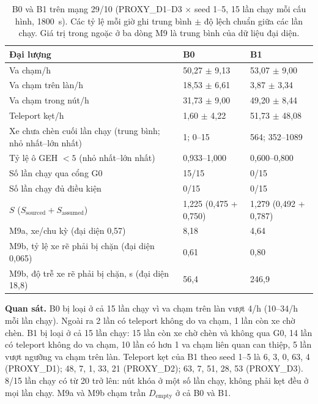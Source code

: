 \documentclass[../main.tex]{subfiles}
\begin{document}
\begin{table}[H]
\centering
\small
\caption{B0 và B1 trên mạng 29/10 (PROXY\_D1--D3 $\times$ seed 1--5, 15 lần chạy mỗi cấu hình, 1800~s). Các tỷ lệ mỗi giờ ghi trung bình $\pm$ độ lệch chuẩn giữa các lần chạy. Giá trị trong ngoặc ở ba dòng M9 là trung bình của dữ liệu đại diện.} \label{table:4.ref_n29}
\begin{tabular}{|p{5.7cm}|p{4.0cm}|p{4.0cm}|}
\hline
\textbf{Đại lượng} & \textbf{B0} & \textbf{B1} \\ \hline
Va chạm/h & 50,27 $\pm$ 9,13 & 53,07 $\pm$ 9,00 \\ \hline
Va chạm trên làn/h & 18,53 $\pm$ 6,61 & 3,87 $\pm$ 3,34 \\ \hline
Va chạm trong nút/h & 31,73 $\pm$ 9,00 & 49,20 $\pm$ 8,44 \\ \hline
Teleport kẹt/h & 1,60 $\pm$ 4,22 & 51,73 $\pm$ 48,08 \\ \hline
Xe chưa chèn cuối lần chạy (trung bình; nhỏ nhất--lớn nhất) & 1; 0--15 & 564; 352--1089 \\ \hline
Tỷ lệ ô GEH $<5$ (nhỏ nhất--lớn nhất) & 0,933--1,000 & 0,600--0,800 \\ \hline
Số lần chạy qua cổng G0 & 15/15 & 0/15 \\ \hline
Số lần chạy đủ điều kiện & 0/15 & 0/15 \\ \hline
$S$ ($S_{\text{sourced}} + S_{\text{assumed}}$) & 1,225 (0,475 + 0,750) & 1,279 (0,492 + 0,787) \\ \hline
M9a, xe/chu kỳ (đại diện 0,57) & 8,18 & 4,64 \\ \hline
M9b, tỷ lệ xe rẽ phải bị chặn (đại diện 0,065) & 0,61 & 0,80 \\ \hline
M9b, độ trễ xe rẽ phải bị chặn, s (đại diện 18,8) & 56,4 & 246,9 \\ \hline
\end{tabular}
\end{table}

\textbf{Quan sát.} B0 bị loại ở cả 15 lần chạy vì va chạm trên làn vượt 4/h (10--34/h mỗi lần chạy). Ngoài ra 2 lần có teleport không do va chạm, 1 lần còn xe chờ chèn. B1 bị loại ở cả 15 lần chạy: 15 lần còn xe chờ chèn và không qua G0, 14 lần có teleport không do va chạm, 10 lần có hơn 1 va chạm liên quan can thiệp, 5 lần vượt ngưỡng va chạm trên làn. Teleport kẹt của B1 theo seed 1--5 là 6, 3, 0, 63, 4 (PROXY\_D1); 48, 7, 1, 33, 21 (PROXY\_D2); 63, 7, 51, 28, 53 (PROXY\_D3). 8/15 lần chạy có từ 20 trở lên: nút khóa ở một số lần chạy, không phải kẹt đều ở mọi lần chạy. M9a và M9b chạm trần $D_{\text{empty}}$ ở cả B0 và B1.
\end{document}
